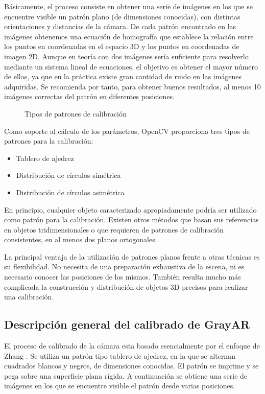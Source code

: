 Básicamente, el proceso consiste en obtener una serie de imágenes en los que se encuentre visible un patrón plano (de dimensiones conocidas), con distintas orientaciones y distancias de la cámara. De cada patrón encontrado en las imágenes obtenemos una ecuación de homografía que establece la relación entre los puntos en coordenadas en el espacio 3D y los puntos en coordenadas de imagen 2D. Aunque en teoría con dos imágenes sería suficiente para resolverlo mediante un sistema lineal de ecuaciones, el objetivo es obtener el mayor número de ellas, ya que en la práctica existe gran cantidad de ruido en las imágenes adquiridas. Se recomienda por tanto, para obtener buenos resultados, al menos 10 imágenes correctas del patrón en diferentes posiciones.

\begin{figure}
\centering
{}
\caption{Tipos de patrones de calibración} \label{fig:pattern} 
\end{figure}


Como soporte al cálculo de los parámetros, OpenCV proporciona tres tipos de patrones para la calibración:

\begin{itemize}
\item Tablero de ajedrez
\item Distribución de círculos simétrica
\item Distribución de círculos asimétrica 
\end{itemize}

En principio, cualquier objeto caracterizado apropiadamente podría ser utilizado como patrón para la calibración. Existen otros métodos que basan sus referencias en objetos tridimensionales o que requieren de patrones de calibración consistentes, en al menos dos planos ortogonales. 

La principal ventaja de la utilización de patrones planos frente a otras técnicas es su flexibilidad. No necesita de una preparación exhaustiva de la escena, ni es necesario conocer las posiciones de los mismos. También resulta mucho más complicada la construcción y distribución de objetos 3D precisos para realizar una calibración.

\subsection{Descripción general del calibrado de GrayAR}
El proceso de calibrado de la cámara esta basado esencialmente por el enfoque de Zhang \cite{Zhang}. Se utiliza un patrón tipo tablero de ajedrez, en la que se alternan cuadrados blancos y negros, de dimensiones conocidas. El patrón se imprime y se pega sobre una superficie plana rígida. A continuación se obtiene una serie de imágenes en los que se encuentre visible el patrón desde varias posiciones. 

